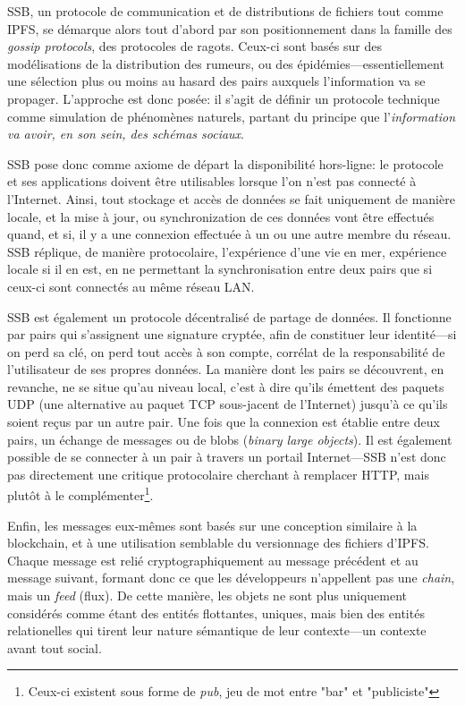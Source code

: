 \documentclass{article}
\begin{document}
SSB, un protocole de communication et de distributions de fichiers tout comme IPFS, se démarque alors tout d'abord par son positionnement dans la famille des \emph{gossip protocols}, des protocoles de ragots. Ceux-ci sont basés sur des modélisations de la distribution des rumeurs, ou des épidémies—essentiellement une sélection plus ou moins au hasard des pairs auxquels l'information va se propager. L'approche est donc posée: il s'agit de définir un protocole technique comme simulation de phénomènes naturels, partant du principe que l'\emph{information va avoir, en son sein, des schémas sociaux}\cite{web3_foundation_secure_2019}.

SSB pose donc comme axiome de départ la disponibilité hors-ligne: le protocole et ses applications doivent être utilisables lorsque l'on n'est pas connecté à l'Internet. Ainsi, tout stockage et accès de données se fait uniquement de manière locale, et la mise à jour, ou synchronization de ces données vont être effectués quand, et si, il y a une connexion effectuée à un ou une autre membre du réseau. SSB réplique, de manière protocolaire, l'expérience d'une vie en mer, expérience locale si il en est, en ne permettant la synchronisation entre deux pairs que si ceux-ci sont connectés au même réseau LAN.

SSB est également un protocole décentralisé de partage de données. Il fonctionne par pairs qui s'assignent une signature cryptée, afin de constituer leur identité—si on perd sa clé, on perd tout accès à son compte, corrélat de la responsabilité de l'utilisateur de ses propres données. La manière dont les pairs se découvrent, en revanche, ne se situe qu'au niveau local, c'est à dire qu'ils émettent des paquets UDP (une alternative au paquet TCP sous-jacent de l'Internet) jusqu'à ce qu'ils soient reçus par un autre pair. Une fois que la connexion est établie entre deux pairs, un échange de messages ou de blobs (\emph{binary large objects}). Il est également possible de se connecter à un pair à travers un portail Internet—SSB n'est donc pas directement une critique protocolaire cherchant à remplacer HTTP, mais plutôt à le complémenter\footnote{Ceux-ci existent sous forme de \emph{pub}, jeu de mot entre "bar" et "publiciste"}.

Enfin, les messages eux-mêmes sont basés sur une conception similaire à la blockchain, et à une utilisation semblable du versionnage des fichiers d'IPFS. Chaque message est relié cryptographiquement au message précédent et au message suivant, formant donc ce que les développeurs n'appellent pas une \emph{chain}, mais un \emph{feed} (flux). De cette manière, les objets ne sont plus uniquement considérés comme étant des entités flottantes, uniques, mais bien des entités relationelles qui tirent leur nature sémantique de leur contexte—un contexte avant tout social.
\end{document}
